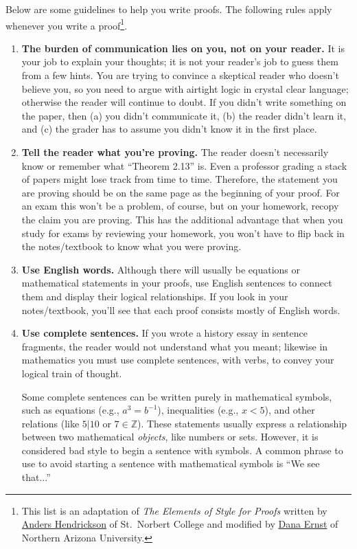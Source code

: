 Below are some guidelines to help you write proofs. 
The following rules apply whenever you write a proof\footnote{
	This list is an adaptation of \emph{The Elements of Style for Proofs} written by \href{http://home.snc.edu/andershendrickson/}{Anders Hendrickson} of St.~Norbert College
	and modified by \href{http://danaernst.com/}{Dana Ernst} of Northern Arizona University.
	}.

\begin{enumerate}

\item \textbf{The burden of communication lies on you, not on your reader.}
	It is your job to explain your thoughts;
	it is not your reader's job to guess them from a few hints.
	You are trying to convince a skeptical reader who doesn't believe you,
	so you need to argue with airtight logic in crystal clear language;
	otherwise the reader will continue to doubt.
	If you didn't write something on the paper, then
	  (a) you didn't communicate it,
	  (b) the reader didn't learn it, and
	  (c) the grader has to assume you didn't know it in the first place.
	  
\item \textbf{Tell the reader what you're proving.}
	The reader doesn't necessarily know or remember what ``Theorem 2.13'' is.
	Even a professor grading a stack of papers might lose track from time to time.
	Therefore, the statement you are proving should be on the same page as the beginning of your proof.
	For an exam this won't be a problem, of course,
	but on your homework, recopy the claim you are proving.
	This has the additional advantage that when you study for exams by reviewing your homework,
	you won't have to flip back in the notes/textbook to know what you were proving.

\item \textbf{Use English words.}
	Although there will usually be equations or mathematical statements in your proofs,
	use English sentences to connect them and display their logical relationships.
	If you look in your notes/textbook, you'll see that each proof consists mostly of English words.

\item \textbf{Use complete sentences.}
	If you wrote a history essay in sentence fragments,
	the reader would not understand what you meant;
	likewise in mathematics you must use complete sentences, with verbs,
	to convey your logical train of thought.
	
	Some complete sentences can be written purely in mathematical symbols, 
	such as 
	  equations (e.g., $a^3=b^{-1}$),
	  inequalities (e.g., $x<5$),
	  and other relations (like $5\big|10$ or $7\in\mathbb{Z}$).
	These statements usually express a relationship between two mathematical \emph{objects},
	like numbers or sets.  However, it is considered bad style to begin a sentence with symbols.  A common phrase to use to avoid starting a sentence with mathematical symbols is ``We see that...''


\end{enumerate}
